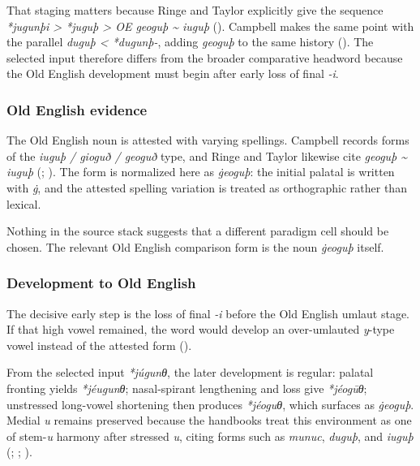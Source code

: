 \documentclass[
  british,
  a4paper,
]{article}
\begin{document}
That staging matters because Ringe and Taylor explicitly give the
sequence \emph{*jugunþi \textgreater{} *juguþ \textgreater{} OE geoguþ
\textasciitilde{} iuguþ} (). Campbell makes the same point with the parallel
\emph{duguþ \textless{} *dugunþ-}, adding \emph{geoguþ} to the same
history (). The selected input
therefore differs from the broader comparative headword because the Old
English development must begin after early loss of final \emph{-i}.

\subsubsection{Old English evidence}\label{old-english-evidence-7}

The Old English noun is attested with varying spellings. Campbell
records forms of the \emph{iuguþ / gioguð / geoguð} type, and Ringe and
Taylor likewise cite \emph{geoguþ \textasciitilde{} iuguþ}
(;
). The form is
normalized here as \emph{ġeoguþ}: the initial palatal is written with
\emph{ġ}, and the attested spelling variation is treated as orthographic
rather than lexical.

Nothing in the source stack suggests that a different paradigm cell
should be chosen. The relevant Old English comparison form is the noun
\emph{ġeoguþ} itself.

\subsubsection{Development to Old
English}\label{development-to-old-english-7}

The decisive early step is the loss of final \emph{-i} before the Old
English umlaut stage. If that high vowel remained, the word would
develop an over-umlauted \emph{y}-type vowel instead of the attested
form ().

From the selected input \emph{*júgunθ}, the later development is
regular: palatal fronting yields \emph{*jéugunθ}; nasal-spirant
lengthening and loss give \emph{*jéogūθ}; unstressed long-vowel
shortening then produces \emph{*jéoguθ}, which surfaces as
\emph{ġeoguþ}. Medial \emph{u} remains preserved because the handbooks
treat this environment as one of stem-\emph{u} harmony after stressed
\emph{u}, citing forms such as \emph{munuc}, \emph{duguþ}, and
\emph{iuguþ} (;
;
).
\end{document}
